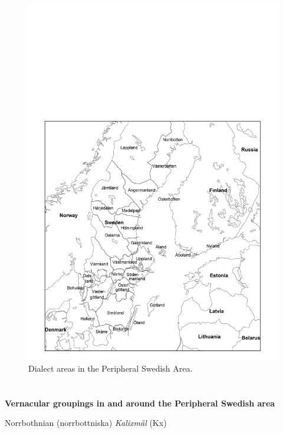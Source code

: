 \begin{figure}[h]

\includegraphics{figures_mod/image5}
\caption{Dialect areas in the Peripheral Swedish Area.}
\label{map:5}

\end{figure}

\section{ }

\textbf{Vernacular groupings in and around the Peripheral Swedish area}

\item 

Norrbothnian (norrbottniska)  \textit{Kalixmål} (Kx)

